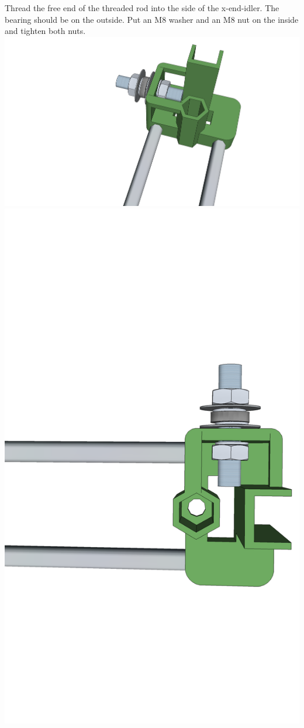 \documentclass[twoside,openany,a4paper,titlepage]{memoir}
\begin{document}
	\section{}
	Thread the free end of the threaded rod into the side of the x-end-idler. The bearing should be on the
	outside. Put an M8 washer and an M8 nut on the inside and tighten both nuts.\\
	\includegraphics[width=1\linewidth]{graphics/ch7_11_1.png}
	\includegraphics[width=1\linewidth]{graphics/ch7_11_2.png}
	
\end{document}
